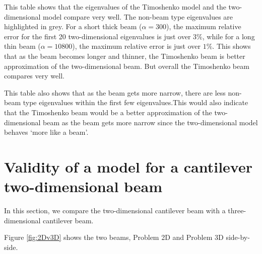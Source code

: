 	This table shows that the eigenvalues of the Timoshenko model and the two-dimensional model compare very well. The non-beam type eigenvalues are highlighted in grey. For a short thick beam ($\alpha = 300$), the maximum relative error for the first 20 two-dimensional eigenvalues is just over $3\%$, while for a long thin beam ($\alpha = 10800$), the maximum relative error is just over $1\%$. This shows that as the beam becomes longer and thinner, the Timoshenko beam is better approximation of the two-dimensional beam. But overall the Timoshenko beam compares very well.

	This table also shows that as the beam gets more narrow, there are less non-beam type eigenvalues within the first few eigenvalues.This would also indicate that the Timoshenko beam would be a better approximation of the two-dimensional beam as the beam gets more narrow since the two-dimensional model behaves `more like a beam'.

\section{Validity of a model for a cantilever two-dimensional beam} \label{sec:validity-of-a-2d-beam}
In this section, we compare the two-dimensional cantilever beam with a three-dimensional cantilever beam.

Figure \ref{fig:2Dv3D} shows the two beams, Problem 2D and Problem 3D side-by-side.

